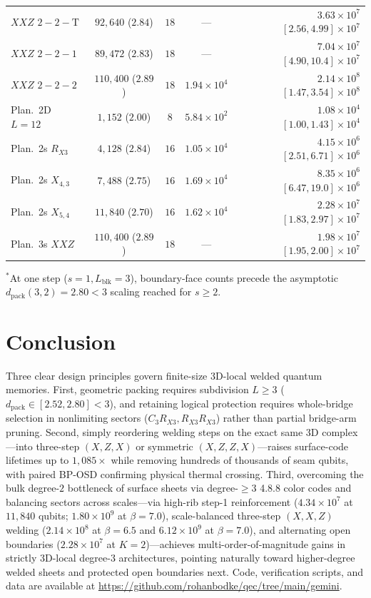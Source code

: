 \documentclass[aps,prx,reprint,superscriptaddress,nofootinbib,floatfix]{revtex4-2}
\begin{document}
\begin{table}[!htbp]
{\begin{ruledtabular}
\begin{tabular}{lcccr}
$XXZ$ $2{-}2{-}\mathrm{T}$ & $92{,}640$ ($2.84$) & $18$ & --- & $3.63{\times}10^7$ $[2.56, 4.99]{\times}10^7$ \\
$XXZ$ $2{-}2{-}1$ & $89{,}472$ ($2.83$) & $18$ & --- & $7.04{\times}10^7$ $[4.90, 10.4]{\times}10^7$ \\
$XXZ$ $2{-}2{-}2$ & $110{,}400$ ($2.89$) & $18$ & $1.94{\times}10^4$ & $2.14{\times}10^8$ $[1.47, 3.54]{\times}10^8$ \\
\colrule
Plan.\ 2D $L{=}12$ & $1{,}152$ ($2.00$) & $8$ & $5.84{\times}10^2$ & $1.08{\times}10^4$ $[1.00, 1.43]{\times}10^4$ \\
Plan.\ 2s $R_{X3}$ & $4{,}128$ ($2.84$) & $16$ & $1.05{\times}10^4$ & $4.15{\times}10^6$ $[2.51, 6.71]{\times}10^6$ \\
Plan.\ 2s $X_{4,3}$ & $7{,}488$ ($2.75$) & $16$ & $1.69{\times}10^4$ & $8.35{\times}10^6$ $[6.47, 19.0]{\times}10^6$ \\
Plan.\ 2s $X_{5,4}$ & $11{,}840$ ($2.70$) & $16$ & $1.62{\times}10^4$ & $2.28{\times}10^7$ $[1.83, 2.97]{\times}10^7$ \\
Plan.\ 3s $XXZ$ & $110{,}400$ ($2.89$) & $18$ & --- & $1.98{\times}10^7$ $[1.95, 2.00]{\times}10^7$ \\
\end{tabular}
\end{ruledtabular}
}
\raggedright\footnotesize $^*$At one step ($s = 1, L_{\mathrm{blk}} = 3$), boundary-face counts precede the asymptotic $d_{\mathrm{pack}}(3, 2) = 2.80 < 3$ scaling reached for $s \ge 2$.
\end{table}

\section{Conclusion}
\label{sec:conclusion}

Three clear design principles govern finite-size 3D-local welded quantum memories. First, geometric packing requires subdivision $L \ge 3$ ($d_{\mathrm{pack}} \in [2.52, 2.80] < 3$), and retaining logical protection requires whole-bridge selection in nonlimiting sectors ($C_3 R_{X3}, R_{X3} R_{X3}$) rather than partial bridge-arm pruning. Second, simply reordering welding steps on the exact same 3D complex---into three-step $(X, Z, X)$ or symmetric $(X, Z, Z, X)$---raises surface-code lifetimes up to $1{,}085\times$ while removing hundreds of thousands of seam qubits, with paired BP-OSD confirming physical thermal crossing. Third, overcoming the bulk degree-$2$ bottleneck of surface sheets via degree-$\ge 3$ 4.8.8 color codes and balancing sectors across scales---via high-rib step-1 reinforcement ($4.34 \times 10^7$ at $11{,}840$ qubits; $1.80 \times 10^9$ at $\beta = 7.0$), scale-balanced three-step $(X, X, Z)$ welding ($2.14 \times 10^8$ at $\beta = 6.5$ and $6.12 \times 10^9$ at $\beta = 7.0$), and alternating open boundaries ($2.28 \times 10^7$ at $K = 2$)---achieves multi-order-of-magnitude gains in strictly 3D-local degree-$3$ architectures, pointing naturally toward higher-degree welded sheets and protected open boundaries next. Code, verification scripts, and data are available at \url{https://github.com/rohanbodke/qec/tree/main/gemini}.
\end{document}
